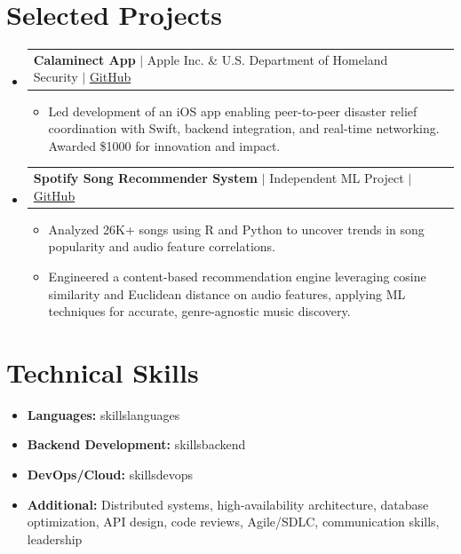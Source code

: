 \documentclass[letterpaper,10pt]{article}
\makeatletter
\newcommand{\resumeItem}[1]{
  \item\small{{#1 \vspace{-2pt}}}
}
\newcommand{\resumeProjectHeading}[2]{
    \item
    \begin{tabular*}{0.97\textwidth}{l@{\extracolsep{\fill}}r}
      \small#1 & \textit{\small #2} \\
    \end{tabular*}\vspace{-7pt}
}
\newcommand{\resumeSubHeadingListStart}{\begin{itemize}[leftmargin=0.15in, label={}]}
\newcommand{\resumeSubHeadingListEnd}{\end{itemize}}
\newcommand{\resumeItemListStart}{\begin{itemize}}
\newcommand{\resumeItemListEnd}{\end{itemize}\vspace{-5pt}}
\makeatother
\begin{document}
\section{Selected Projects}
  \resumeSubHeadingListStart


    \resumeProjectHeading
      {\textbf{Calaminect App} $\vert$ Apple Inc. \& U.S. Department of Homeland Security $\vert$ \href{https://github.com/zelzar/ProjectX}{GitHub}}{}
        \resumeItemListStart
          \resumeItem{Led development of an iOS app enabling peer-to-peer disaster relief coordination with Swift, backend integration, and real-time networking. Awarded \$1000 for innovation and impact.}
        \resumeItemListEnd

    \resumeProjectHeading
      {\textbf{Spotify Song Recommender System} $\vert$ Independent ML Project $\vert$ \href{https://github.com/zelzar/Personal-Projects/tree/potli/SongRecommender}{GitHub}}{}
        \resumeItemListStart
          \resumeItem{Analyzed 26K+ songs using R and Python to uncover trends in song popularity and audio feature correlations.}
          \resumeItem{Engineered a content-based recommendation engine leveraging cosine similarity and Euclidean distance on audio features, applying ML techniques for accurate, genre-agnostic music discovery.}
        \resumeItemListEnd

  \resumeSubHeadingListEnd

\section{Technical Skills}
\begin{itemize}[leftmargin=0.15in, label={--}]
    \item\small{\textbf{Languages:} {{ skillslanguages }}}\vspace{-5pt}
    \item\small{\textbf{Backend Development:} {{ skillsbackend }}}\vspace{-5pt}
    \item\small{\textbf{DevOps/Cloud:} {{ skillsdevops }}}\vspace{-5pt}
    \item\small{\textbf{Additional:} Distributed systems, high-availability architecture, database optimization, API design, code reviews, Agile/SDLC, communication skills, leadership}\vspace{-5pt}
\end{itemize}
\end{document}

